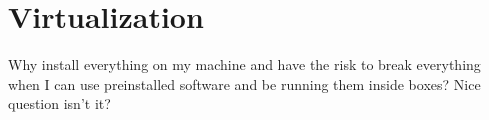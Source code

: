 \chapter{Virtualization}
Why install everything on my machine and have the risk to break everything when I can use preinstalled software and be running them inside boxes? Nice question isn't it?



